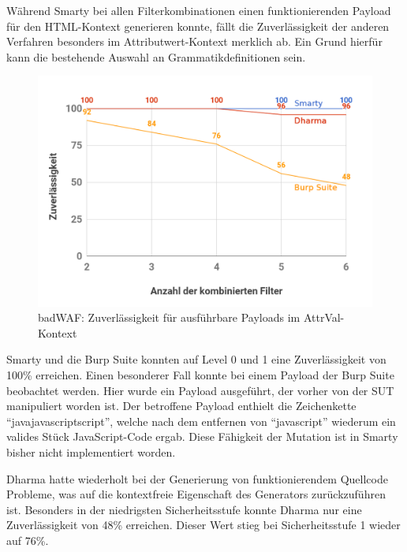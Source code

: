 \FloatBarrier
Während Smarty bei allen Filterkombinationen einen funktionierenden Payload für den HTML-Kontext generieren konnte, fällt die Zuverlässigkeit der anderen Verfahren besonders im Attributwert-Kontext merklich ab. Ein Grund hierfür kann die bestehende Auswahl an Grammatikdefinitionen sein.

\begin{figure}[htbp] 
	\centering
	\includegraphics[width=\textwidth]{contents/images/BadWAFDiagramReflectedFilterAttrValCombined}
	\caption{badWAF: Zuverlässigkeit für ausführbare Payloads im AttrVal-Kontext}
	\label{fig:badWAF-attrval-execute-combined}
\end{figure}

\label{ssec:evaluation-executed-bwapp}

Smarty und die Burp Suite konnten auf Level 0 und 1 eine Zuverlässigkeit von 100\% erreichen. Einen besonderer Fall konnte bei einem Payload der Burp Suite beobachtet werden. Hier wurde ein Payload ausgeführt, der vorher von der SUT manipuliert worden ist. Der betroffene Payload enthielt die Zeichenkette ``javajavascriptscript'', welche nach dem entfernen von ``javascript'' wiederum ein valides Stück JavaScript-Code ergab. Diese Fähigkeit der Mutation ist in Smarty bisher nicht implementiert worden. 

Dharma hatte wiederholt bei der Generierung von funktionierendem Quellcode Probleme, was auf die kontextfreie Eigenschaft des Generators zurückzuführen ist. Besonders in der niedrigsten Sicherheitsstufe konnte Dharma nur eine Zuverlässigkeit von 48\% erreichen. Dieser Wert stieg bei Sicherheitsstufe 1 wieder auf 76\%.

